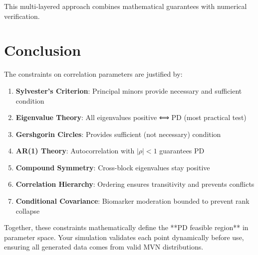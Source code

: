 \documentclass[12pt,a4paper]{article}
\theoremstyle{definition}
\begin{document}
This multi-layered approach combines mathematical guarantees with numerical verification.

\section{Conclusion}

The constraints on correlation parameters are justified by:

\begin{enumerate}
  \item \textbf{Sylvester's Criterion}: Principal minors provide necessary and sufficient condition

  \item \textbf{Eigenvalue Theory}: All eigenvalues positive ⟺ PD (most practical test)

  \item \textbf{Gershgorin Circles}: Provides sufficient (not necessary) condition

  \item \textbf{AR(1) Theory}: Autocorrelation with $|\rho| < 1$ guarantees PD

  \item \textbf{Compound Symmetry}: Cross-block eigenvalues stay positive

  \item \textbf{Correlation Hierarchy}: Ordering ensures transitivity and prevents conflicts

  \item \textbf{Conditional Covariance}: Biomarker moderation bounded to prevent rank collapse
\end{enumerate}

Together, these constraints mathematically define the **PD feasible region** in parameter space. Your simulation validates each point dynamically before use, ensuring all generated data comes from valid MVN distributions.
\end{document}
